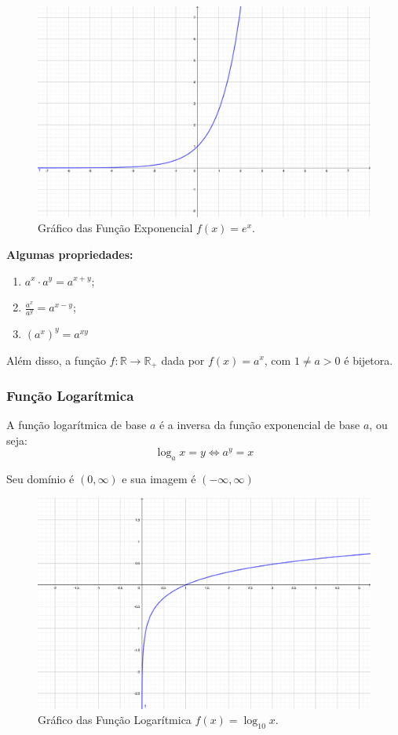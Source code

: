 \documentclass[oneside,a4paper,12pt]{article}
\begin{document}
\begin{figure}[h!]
	\centering
	\includegraphics[width=0.8\linewidth]{Figuras/expe}
	\caption{Gráfico das Função Exponencial $f(x) = e^{x}$.}
\end{figure}

\textbf{Algumas propriedades:}
\begin{enumerate}
	\item $a^{x} \cdot a^{y} = a^{x+y}$;
	\item $\frac{a^{x}}{a^{y}} = a^{x-y}$;
	\item $(a^{x})^{y} = a^{xy}$
\end{enumerate}

Além disso, a função $f: \mathbb{R} \rightarrow \mathbb{R}_{+}$ dada por $f(x) = a^{x}$, com $1 \neq a > 0$ é bijetora.


\subsubsection{Função Logarítmica}

A função logarítmica de base $a$ é a inversa da função exponencial de base $a$, ou seja:
$$\log_{a}x = y \Leftrightarrow a^{y} = x$$

Seu domínio é $(0, \infty)$ e sua imagem é $(- \infty, \infty)$

\begin{figure}[h!]
	\centering
	\includegraphics[width=0.8\linewidth]{Figuras/log10}
	\caption{Gráfico das Função Logarítmica $f(x) = \log_{10}x$.}
\end{figure}
\end{document}
